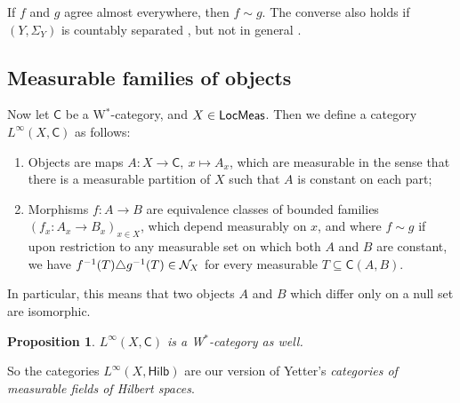 \documentclass[reqno,T1]{amsproc}
\newcommand{\cat}[1]{\mathsf{#1}}		%
\newcommand{\Hilb}{\mathsf{Hilb}} 		%
\theoremstyle{plain}
\newtheorem{prop}[thm]{Proposition}
\theoremstyle{remark}
\numberwithin{equation}{section}
\begin{document}
If $f$ and $g$ agree almost everywhere, then $f \sim g$. The converse also holds if $(Y,\Sigma_Y)$ is countably separated \cite[343F]{fremlin3}, but not in general \cite[343I]{fremlin3}. 


\subsection{Measurable families of objects}

Now let $\cat{C}$ be a W$^*$-category, and $X \in \LMeas$. Then we define a category $L^\infty(X,\cat{C})$ as follows:

\begin{enumerate}
\item Objects are maps $A : X \to \cat{C}, \: x\mapsto A_x$, which are measurable in the sense that there is a measurable partition of $X$ such that $A$ is constant on each part;
\item Morphisms $f : A\to B$ are equivalence classes of bounded families $(f_x : A_x\to B_x)_{x\in X}$, which depend measurably  on $x$, and where $f \sim g$ if upon restriction to any measurable set on which both $A$ and $B$ are constant, we have $f^{-1}(T) \triangle g^{-1}(T) \in \mathcal{N}_X$ for every measurable $T \subseteq \cat{C}(A,B)$.
\end{enumerate}

In particular, this means that two objects $A$ and $B$ which differ only on a null set are isomorphic.

\begin{prop}
$L^\infty(X,\cat{C})$ is a W$^*$-category as well.
\end{prop}

So the categories $L^\infty(X,\Hilb)$ are our version of Yetter's \emph{categories of measurable fields of Hilbert spaces}.

\end{document}
